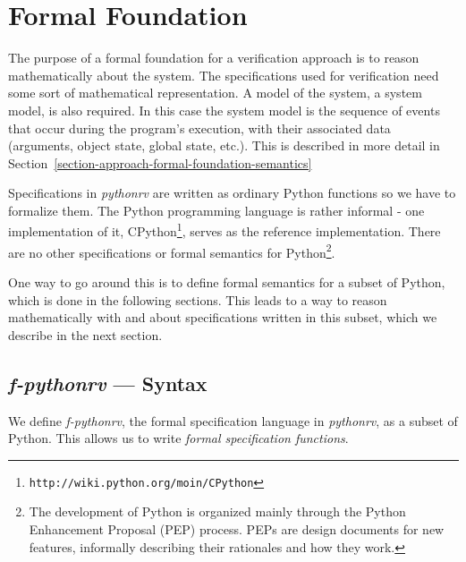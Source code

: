 
\section{Formal Foundation} \label{section-approach-formal-foundation}

The purpose of a formal foundation for a verification approach is to reason
mathematically about the system. The specifications used for verification need
some sort of mathematical representation. A model of the system, a system
model, is also required. In this case the system model is the sequence of
events that occur during the program's execution, with their associated data
(arguments, object state, global state, etc.). This is described in more detail
in Section~\ref{section-approach-formal-foundation-semantics}

Specifications in \textit{pythonrv} are written as ordinary Python functions so
we have to formalize them.  The Python programming language is rather informal
- one implementation of it,
CPython\footnote{\texttt{http://wiki.python.org/moin/CPython}}, serves as the
reference implementation.  There are no other specifications or formal
semantics for Python\footnote{The development of Python is organized mainly
through the Python Enhancement Proposal (PEP) process. PEPs are design
documents for new features, informally describing their rationales and how they
work.}.

One way to go around this is to define formal semantics for a subset of Python,
which is done in the following sections. This leads to a way to reason
mathematically with and about specifications written in this subset, which we
describe in the next section.





\subsection{\textit{f-pythonrv} --- Syntax}
\label{section-approach-python-subset}
\lstset{language=Python,numbers=left}

We define \textit{f-pythonrv}, the formal specification language in
\textit{pythonrv}, as a subset of Python. This allows us to write
\textit{formal specification functions}.


